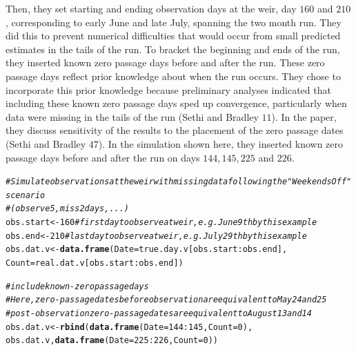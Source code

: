 \documentclass[12pt]{article}\usepackage[]{graphicx}\usepackage[]{color}
\makeatletter
\newcommand{\hlnum}[1]{\textcolor[rgb]{0.686,0.059,0.569}{#1}}%
\newcommand{\hlcom}[1]{\textcolor[rgb]{0.678,0.584,0.686}{\textit{#1}}}%
\newcommand{\hlopt}[1]{\textcolor[rgb]{0,0,0}{#1}}%
\newcommand{\hlstd}[1]{\textcolor[rgb]{0.345,0.345,0.345}{#1}}%
\newcommand{\hlkwb}[1]{\textcolor[rgb]{0.69,0.353,0.396}{#1}}%
\newcommand{\hlkwc}[1]{\textcolor[rgb]{0.333,0.667,0.333}{#1}}%
\newcommand{\hlkwd}[1]{\textcolor[rgb]{0.737,0.353,0.396}{\textbf{#1}}}%
\newenvironment{kframe}{%
 \def\at@end@of@kframe{}%
 \ifinner\ifhmode%
  \def\at@end@of@kframe{\end{minipage}}%
  \begin{minipage}{\columnwidth}%
 \fi\fi%
 \def\FrameCommand##1{\hskip\@totalleftmargin \hskip-\fboxsep
 \colorbox{shadecolor}{##1}\hskip-\fboxsep
     \hskip-\linewidth \hskip-\@totalleftmargin \hskip\columnwidth}%
 \MakeFramed {\advance\hsize-\width
   \@totalleftmargin\z@ \linewidth\hsize
   \@setminipage}}%
 {\par\unskip\endMakeFramed%
 \at@end@of@kframe}
\newenvironment{knitrout}{}{} %
\makeatother
\begin{document}
\noindent Then, they set starting and ending observation days at the weir, day $160$ and $210$, corresponding to early June and late July, spanning the two month run. They did this to prevent numerical difficulties that would occur from small predicted estimates in the tails of the run. To bracket the beginning and ends of the run, they inserted known zero passage days before and after the run. These zero passage days reflect prior knowledge about when the run occurs. They chose to incorporate this prior knowledge because preliminary analyses indicated that including these known zero passage days sped up convergence, particularly when data were missing in the tails of the run (Sethi and Bradley $11$). In the paper, they discuss sensitivity of the results to the placement of the zero passage dates (Sethi and Bradley $47$). In the simulation shown here, they inserted known zero passage days before and after the run on days $144, 145, 225$ and $226$.  

\begin{knitrout}\footnotesize
{}\color{fgcolor}\begin{kframe}
\begin{alltt}
\hlcom{#Simulate observations at the weir with missing data following the "Weekends Off" scenario}
\hlcom{#(observe 5, miss 2 days, ...)}
\hlstd{obs.start} \hlkwb{<-} \hlnum{160} \hlcom{# first day to observe at weir, e.g. June 9th by this example}
\hlstd{obs.end} \hlkwb{<-} \hlnum{210} \hlcom{# last day to observe at weir, e.g. July 29th by this example}
\hlstd{obs.dat.v} \hlkwb{<-} \hlkwd{data.frame}\hlstd{(}\hlkwc{Date} \hlstd{= true.day.v[obs.start}\hlopt{:}\hlstd{obs.end],}
                        \hlkwc{Count} \hlstd{= real.dat.v[obs.start}\hlopt{:}\hlstd{obs.end])}

\hlcom{# include known-zero passage days}
\hlcom{# Here, zero-passage dates before observation are equivalent to May 24 and 25}
\hlcom{#post-observation zero-passage dates are equivalent to August 13 and 14}
\hlstd{obs.dat.v} \hlkwb{<-} \hlkwd{rbind}\hlstd{(}\hlkwd{data.frame}\hlstd{(}\hlkwc{Date}\hlstd{=}\hlnum{144}\hlopt{:}\hlnum{145}\hlstd{,} \hlkwc{Count}\hlstd{=}\hlnum{0}\hlstd{),}
                   \hlstd{obs.dat.v,} \hlkwd{data.frame}\hlstd{(}\hlkwc{Date}\hlstd{=}\hlnum{225}\hlopt{:}\hlnum{226}\hlstd{,} \hlkwc{Count}\hlstd{=}\hlnum{0}\hlstd{))}
\end{alltt}
\end{kframe}
\end{knitrout}
\end{document}
